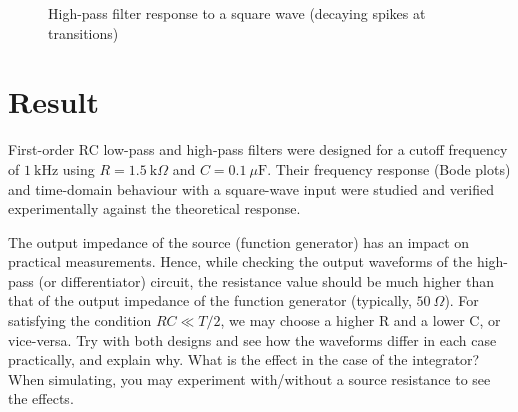 \begin{figure}[ht!]
	\centering
	\caption{High-pass filter response to a square wave (decaying spikes at transitions)}
	\label{fig:waveform-hpf}
\end{figure}
\clearpage
\section{Result}
First-order RC low-pass and high-pass filters were designed for a cutoff
frequency of $1\ \text{kHz}$ using $R = 1.5\ \text{k}\Omega$ and
$C = 0.1\ \mu\text{F}$. Their frequency response (Bode plots) and time-domain
behaviour with a square-wave input were studied and verified experimentally
against the theoretical response.
\begin{explorebox}
	The output impedance of the source (function generator) has an impact on practical measurements. Hence, while checking the output waveforms of the high-pass (or differentiator) circuit, the resistance value should be much higher than that of the output impedance of the function generator (typically, $50\ \Omega$). For satisfying the condition $RC \ll T/2$, we may choose a higher R and a lower C, or vice-versa. Try with both designs and see how the waveforms differ in each case practically, and explain why. What is the effect in the case of the integrator? When simulating, you may experiment with/without a source resistance to see the effects.
\end{explorebox}

